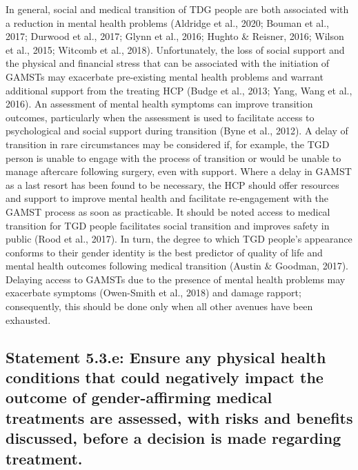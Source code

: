 \documentclass[
]{book}
\begin{document}
In general, social and medical transition of
TDG people are both associated with a reduction in mental health problems (Aldridge et al.,
2020; Bouman et al., 2017; Durwood et al., 2017;
Glynn et al., 2016; Hughto \& Reisner, 2016;
Wilson et al., 2015; Witcomb et al., 2018).
Unfortunately, the loss of social support and the
physical and financial stress that can be associated with the initiation of GAMSTs may exacerbate pre-existing mental health problems and
warrant additional support from the treating
HCP (Budge et al., 2013; Yang, Wang et al.,
2016). An assessment of mental health symptoms can improve transition outcomes, particularly when the assessment is used to facilitate
access to psychological and social support during
transition (Byne et al., 2012). A delay of transition in rare circumstances may be considered
if, for example, the TGD person is unable to
engage with the process of transition or would
be unable to manage aftercare following surgery,
even with support. Where a delay in GAMST
as a last resort has been found to be necessary,
the HCP should offer resources and support to
improve mental health and facilitate
re-engagement with the GAMST process as soon
as practicable. It should be noted access to medical transition for TGD people facilitates social
transition and improves safety in public (Rood
et al., 2017). In turn, the degree to which TGD
people's appearance conforms to their gender
identity is the best predictor of quality of life
and mental health outcomes following medical
transition (Austin \& Goodman, 2017). Delaying
access to GAMSTs due to the presence of mental
health problems may exacerbate symptoms
(Owen-Smith et al., 2018) and damage rapport;
consequently, this should be done only when all
other avenues have been exhausted.

\hypertarget{statement-5.3.e-ensure-any-physical-health-conditions-that-could-negatively-impact-the-outcome-of-gender-affirming-medical-treatments-are-assessed-with-risks-and-benefits-discussed-before-a-decision-is-made-regarding-treatment.}{%
\subsection*{Statement 5.3.e: Ensure any physical health conditions that could negatively impact the outcome of gender-affirming medical treatments are assessed, with risks and benefits discussed, before a decision is made regarding treatment.}\label{statement-5.3.e-ensure-any-physical-health-conditions-that-could-negatively-impact-the-outcome-of-gender-affirming-medical-treatments-are-assessed-with-risks-and-benefits-discussed-before-a-decision-is-made-regarding-treatment.}}
\end{document}
